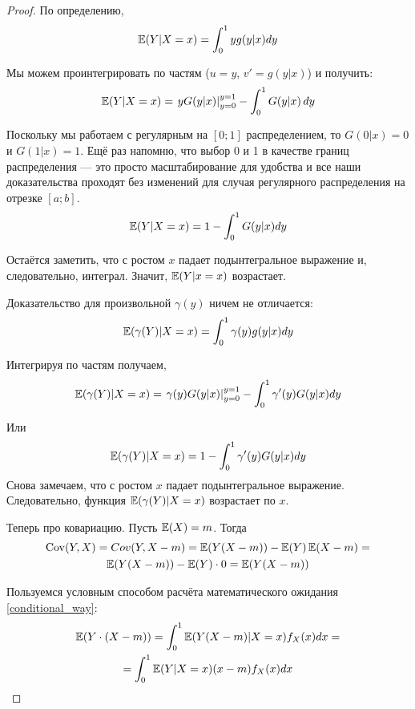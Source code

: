 \begin{proof}
По определению,
\begin{equation}
\operatorname{\mathbb{E}}(Y|X=x)=\int_{0}^{1}yg(y|x)dy
\end{equation}

Мы можем проинтегрировать по частям ($ u=y $, $ v'=g(y|x) $) и получить:
\begin{equation}
\operatorname{\mathbb{E}}(Y|X=x)=\left.yG(y|x)\right|_{y=0}^{y=1} - \int_{0}^{1}G(y|x) \, dy
\end{equation}

Поскольку мы работаем с регулярным на $ [0;1] $ распределением, то $ G(0|x)=0 $ и $ G(1|x)=1 $. Ещё раз напомню, что выбор 0 и 1 в качестве границ распределения — это просто масштабирование для удобства и все наши доказательства проходят без изменений для случая регулярного распределения на отрезке $ [a;b] $.
\begin{equation}
\operatorname{\mathbb{E}}(Y|X=x)=1 - \int_{0}^{1}G(y|x)dy
\end{equation}

Остаётся заметить, что с ростом $ x $ падает подынтегральное выражение и, следовательно, интеграл. Значит, $ \operatorname{\mathbb{E}}(Y|x=x) $ возрастает.

Доказательство для произвольной $ \gamma(y) $ ничем не отличается:
\begin{equation}
\operatorname{\mathbb{E}}(\gamma(Y)|X=x)=\int_{0}^{1}\gamma(y)g(y|x)dy
\end{equation}

Интегрируя по частям получаем,
\begin{equation}
\operatorname{\mathbb{E}}(\gamma(Y)|X=x)=\left.\gamma(y)G(y|x)\right|_{y=0}^{y=1} - \int_{0}^{1}\gamma'(y)G(y|x)dy
\end{equation}

Или
\begin{equation}
\operatorname{\mathbb{E}}(\gamma(Y)|X=x)=1 - \int_{0}^{1}\gamma'(y)G(y|x)dy
\end{equation}
Снова замечаем, что с ростом $ x $ падает подынтегральное выражение. Следовательно, функция $ \operatorname{\mathbb{E}}(\gamma(Y)|X=x) $ возрастает по $x$.


Теперь про ковариацию. Пусть $ \operatorname{\mathbb{E}}(X)=m $. Тогда
\begin{multline}
\operatorname{Cov}(Y,X)=Cov(Y,X-m)=\operatorname{\mathbb{E}}(Y(X-m))-\operatorname{\mathbb{E}}(Y)\operatorname{\mathbb{E}}(X-m)=\\
\operatorname{\mathbb{E}}(Y(X-m))-\operatorname{\mathbb{E}}(Y)\cdot 0=\operatorname{\mathbb{E}}(Y(X-m))
\end{multline}

Пользуемся условным способом расчёта математического ожидания \ref{conditional_way}:
\begin{multline} \index{условное математическое ожидание}
\E(Y\cdot (X-m))=\int_{0}^{1} \E(Y(X-m)|X=x)f_{X}(x)dx=\\
=\int_{0}^{1}\E(Y|X=x)(x-m)f_{X}(x)dx
\end{multline}


\end{proof}

